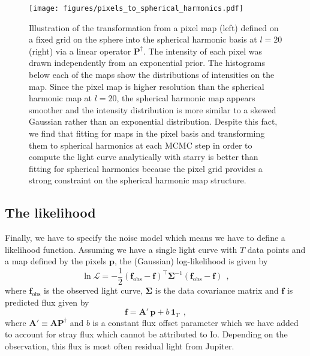 \documentclass[12pt,dvipsnames]{report}
\newcommand{\hquad}{~~}
\begin{document}
\begin{figure}[t!]
    \begin{centering}
    \texttt{[image: figures/pixels\_to\_spherical\_harmonics.pdf]}
    \caption{
        Illustration of the transformation from a pixel map (left) defined on a fixed grid on the sphere into the spherical harmonic basis at $l=20$ (right) via a linear operator $\mathbf{P}^\dagger$.
        The intensity of each pixel was drawn independently from an exponential prior.
        The histograms below each of the maps show the distributions of intensities on the map. 
        Since the pixel map is higher resolution than the spherical harmonic map at $l=20$, the         spherical harmonic map appears smoother and the intensity distribution is more similar to a skewed Gaussian rather than an exponential distribution.
        Despite this fact, we find that fitting for maps in the pixel basis and transforming them to spherical harmonics at each MCMC step in order to compute the light curve analytically with \textsf{starry} is better than fitting for spherical harmonics because the pixel grid provides a strong constraint on the spherical harmonic map structure.
    }
  \label{fig:pixels_to_harmonics}
    \end{centering}
\end{figure}


\subsection{The likelihood}
\label{ssec:likelihood}
Finally, we have to specify the noise model which means we have to define a likelihood function.
Assuming we have a single light curve with $T$ data points and a map defined by the pixels $\mathbf{p}$, the (Gaussian) log-likelihood is given by
\begin{equation}
    \ln\mathcal{L}=-\frac{1}{2}\left(\mathbf{f}_\mathrm{obs}-\mathbf{f} \right)^{\top}
    \boldsymbol{\Sigma}^{-1}\left(\mathbf{f}_\mathrm{obs}-\mathbf{f} \right)
    \hquad,
    \label{eq:likelihood_io}
\end{equation}
where $\mathbf{f}_\mathrm{obs}$ is the observed light curve, $\boldsymbol{\Sigma}$ is the data covariance matrix and $\mathbf{f}$ is predicted flux given by
\begin{equation}
    \mathbf{f}=\mathbf{A}'\,\mathbf{p} +b\,\mathbf{1}_T
    \hquad,
    \label{eq:flux_model_io}
\end{equation}
where $\mathbf{A}'\equiv\mathbf{A}\mathbf{P}^\dagger$ and $b$ is a constant flux offset 
parameter which we have added to account for stray flux which cannot be attributed to Io.
Depending on the observation, this flux is most often residual light from Jupiter.
\end{document}
